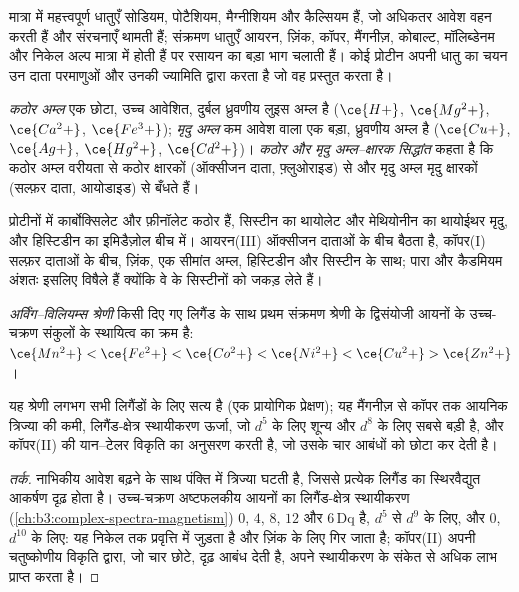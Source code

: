 मात्रा में महत्त्वपूर्ण धातुएँ सोडियम, पोटैशियम, मैग्नीशियम और
कैल्सियम हैं, जो अधिकतर आवेश वहन करती हैं और संरचनाएँ थामती हैं; संक्रमण धातुएँ
आयरन, ज़िंक, कॉपर, मैंगनीज़, कोबाल्ट, मॉलिब्डेनम और निकेल अल्प मात्रा में होती हैं
पर रसायन का बड़ा भाग चलाती हैं। कोई प्रोटीन अपनी धातु का चयन उन दाता
परमाणुओं और उनकी ज्यामिति द्वारा करता है जो वह प्रस्तुत करता है।

\begin{definition}[कठोर और मृदु अम्ल]\label{def:b3:bioinorganic:hsab}
\emph{कठोर अम्ल} एक छोटा, उच्च आवेशित, दुर्बल
ध्रुवणीय लुइस अम्ल है ($\ce{H+}$, $\ce{Mg^2+}$, $\ce{Ca^2+}$, $\ce{Fe^3+}$); \emph{मृदु
अम्ल} कम आवेश वाला एक बड़ा, ध्रुवणीय अम्ल है ($\ce{Cu+}$, $\ce{Ag+}$,
$\ce{Hg^2+}$, $\ce{Cd^2+}$)। \emph{कठोर और मृदु अम्ल--क्षारक सिद्धांत}
कहता है कि कठोर अम्ल वरीयता से कठोर क्षारकों
(ऑक्सीजन दाता, फ़्लुओराइड) से और मृदु अम्ल मृदु क्षारकों (सल्फ़र दाता, आयोडाइड) से बँधते हैं।
\end{definition}

प्रोटीनों में कार्बोक्सिलेट और फ़ीनॉलेट कठोर हैं, सिस्टीन का थायोलेट और
मेथियोनीन का थायोईथर मृदु, और हिस्टिडीन का इमिडैज़ोल बीच में। आयरन(III)
ऑक्सीजन दाताओं के बीच बैठता है, कॉपर(I) सल्फ़र दाताओं के बीच, ज़िंक, एक सीमांत
अम्ल, हिस्टिडीन और सिस्टीन के साथ; पारा और कैडमियम अंशतः इसलिए विषैले हैं
क्योंकि वे  के सिस्टीनों को जकड़ लेते हैं।

\begin{definition}[अर्विंग--विलियम्स श्रेणी]\label{def:b3:bioinorganic:irving-williams}
\emph{अर्विंग--विलियम्स श्रेणी} किसी दिए गए लिगैंड के साथ
प्रथम संक्रमण श्रेणी के द्विसंयोजी आयनों के उच्च-चक्रण संकुलों के स्थायित्व का
क्रम है:
$\ce{Mn^2+} < \ce{Fe^2+} < \ce{Co^2+} < \ce{Ni^2+} < \ce{Cu^2+} > \ce{Zn^2+}$।
\end{definition}

\begin{proposition}[अर्विंग--विलियम्स क्रम]\label{prop:b3:bioinorganic:irving-williams}
यह श्रेणी लगभग सभी लिगैंडों के लिए सत्य है (एक प्रायोगिक प्रेक्षण); यह
मैंगनीज़ से कॉपर तक आयनिक त्रिज्या की कमी, लिगैंड-क्षेत्र
स्थायीकरण ऊर्जा, जो $d^5$ के लिए शून्य और $d^8$ के लिए सबसे बड़ी है, और कॉपर(II) की यान--टेलर
विकृति का अनुसरण करती है, जो उसके चार आबंधों को छोटा कर देती है।
\end{proposition}

\begin{proof}[तर्क]
नाभिकीय आवेश बढ़ने के साथ पंक्ति में त्रिज्या घटती है, जिससे प्रत्येक लिगैंड का
स्थिरवैद्युत आकर्षण दृढ़ होता है। उच्च-चक्रण अष्टफलकीय आयनों का लिगैंड-क्षेत्र स्थायीकरण
(\cref{ch:b3:complex-spectra-magnetism}) $0$, $4$,
$8$, $12$ और $6\,\mathrm{Dq}$ है, $d^5$ से $d^9$ के लिए, और $0$, $d^{10}$ के लिए: यह निकेल तक प्रवृत्ति में जुड़ता है और
ज़िंक के लिए गिर जाता है; कॉपर(II) अपनी चतुष्कोणीय विकृति द्वारा, जो चार छोटे, दृढ़ आबंध देती है,
अपने स्थायीकरण के संकेत से अधिक लाभ प्राप्त करता है।
\end{proof}


